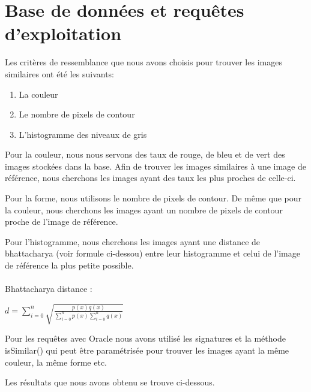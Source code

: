 \section{Base de données et requêtes d'exploitation}

Les critères de ressemblance que nous avons choisis pour trouver les images similaires ont été les suivants:
\begin{enumerate}
\item La couleur
\item Le nombre de pixels de contour
\item L'histogramme des niveaux de gris
\end{enumerate} 

Pour la couleur, nous nous servons des taux de rouge, de bleu et de vert des images stockées dans la base. Afin de trouver les images similaires à une image de référence, nous cherchons les images ayant des taux les plus proches de celle-ci.

Pour la forme, nous utilisons le nombre de pixels de contour. De même que pour la couleur, nous cherchons les images ayant un nombre de pixels de contour proche de l'image de référence.

Pour l'histogramme, nous cherchons les images ayant une distance de bhattacharya (voir formule ci-dessou)  entre leur histogramme et celui de l'image de référence la plus petite possible.

\paragraph{}Bhattacharya distance :
\begin{center} 
$d = \sum\limits_{i=0}^n\sqrt{\frac{p(x)q(x)}{\sum\limits_{i=0}^n p(x)\sum\limits_{i=0}^n q(x)} }$ 
\end{center} 

Pour les requêtes avec Oracle nous avons utilisé les signatures et la méthode isSimilar() qui peut être paramétrisée pour trouver les images ayant la même couleur, la même forme etc.

Les résultats que nous avons obtenu se trouve ci-dessous.


